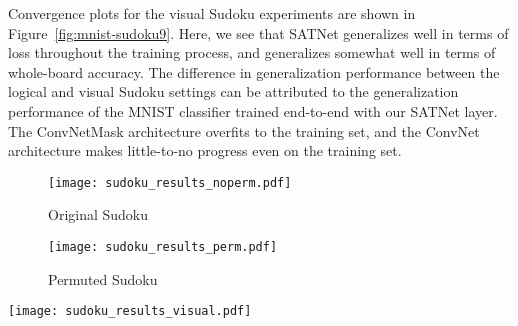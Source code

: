 \documentclass{article}
\begin{document}
{{    Convergence plots for the visual Sudoku experiments are shown in Figure~\ref{fig:mnist-sudoku9}.
    Here, we see that SATNet generalizes well in terms of loss throughout the training process, and generalizes somewhat well in terms of whole-board accuracy. 
    The difference in generalization performance between the logical and visual Sudoku settings can be attributed to the generalization performance of the MNIST classifier trained end-to-end with our SATNet layer.
    The ConvNetMask architecture overfits to the training set, and the ConvNet architecture makes little-to-no progress even on the training set.  


    
    
    








\begin{figure*}[htb]
	\centering
	\begin{subfigure}{\textwidth}
	\texttt{[image: sudoku\_results\_noperm.pdf]}
	\caption{Original  Sudoku}
	\end{subfigure}
	\par\bigskip


    \begin{subfigure}{\textwidth}
	\texttt{[image: sudoku\_results\_perm.pdf]}
	\caption{Permuted  Sudoku}
	\end{subfigure}
\caption{Results for our  Sudoku experiments. 
		Lower loss (mean NLL loss and mean MSE loss) and higher whole-board accuracy (\% puzzles correct) are better.}	\label{fig:sudoku9}
	\end{figure*}
\par\bigskip
\par\bigskip
\begin{figure*}[htb]
	\centering
	\texttt{[image: sudoku\_results\_visual.pdf]}
	\caption{Results for our visual Sudoku experiments. 
		Lower loss (mean NLL loss and mean MSE loss) and higher whole-board accuracy (\% puzzles correct) are better. The theoretical ``best'' test accuracy plotted is for our specific choice of MNIST classifier architecture.}	\label{fig:mnist-sudoku9}
	\end{figure*}
    
    \iffalse
}}
\end{document}
